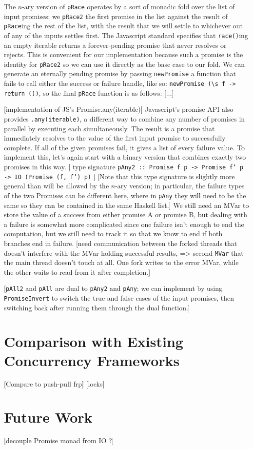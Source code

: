 \documentclass[12pt, english, letterpaper]{kuthesis}
\newcommand{\lit}[1]{\texttt{#1}}
\begin{document}
The \(n\)-ary version of \lit{pRace} operates by a sort of monadic fold over the list of input promises: we \lit{pRace2} the first promise in the list against the result of \lit{pRace}ing the rest of the list, with the result that we will settle to whichever out of any of the inputs settles first.  The Javascript standard specifies that \lit{race()}ing an empty iterable returns a forever-pending promise that never resolves or rejects.  This is convenient for our implementation because such a promise is the identity for \lit{pRace2} so we can use it directly as the base case to our fold.  We can generate an eternally pending promise by passing \lit{newPromise} a function that fails to call either the success or failure handle, like so: \verb|newPromise (\s f -> return ())|, so the final \lit{pRace} function is as follows:
[...]

[implementation of JS's Promise.any(iterable)] Javascript's promise API also provides \lit{.any(iterable)}, a different way to combine any number of promises in parallel by executing each simultaneously.  The result is a promise that immediately resolves to the value of the first input promise to successfully complete.  If all of the given promises fail, it gives a list of every failure value.  To implement this, let's again start with a binary version that combines exactly two promises in this way.  [ type signature \lit{pAny2 :: Promise f p -> Promise f' p -> IO (Promise (f, f') p)} ] [Note that this type signature is slightly more general than will be allowed by the \(n\)-ary version; in particular, the failure types of the two Promises can be different here, where in \lit{pAny} they will need to be the same so they can be contained in the same Haskell list.]  We still need an MVar to store the value of a success from either promise A or promise B, but dealing with a failure is somewhat more complicated since one failure isn't enough to end the computation, but we still need to track it so that we know to end if both branches end in failure. [need communication between the forked threads that doesn't interfere with the MVar holding successful results, => second \lit{MVar} that the main thread doesn't touch at all.  One fork writes to the error MVar, while the other waits to read from it after completion.]

[\lit{pAll2} and \lit{pAll} are dual to \lit{pAny2} and \lit{pAny}; we can implement by using \lit{PromiseInvert} to switch the true and false cases of the input promises, then switching back after running them through the dual function.]

\section{Comparison with Existing Concurrency Frameworks}
[Compare to push-pull frp]
[locks]

\section{Future Work}

[decouple Promise monad from IO ?]
\end{document}
